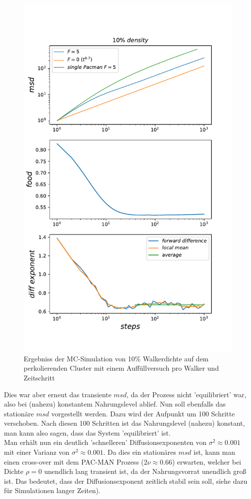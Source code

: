 \documentclass[a4paper, 12pt]{report}
\begin{document}
\begin{figure}[H]
	\centering
	\includegraphics[scale=0.75]{10percent_new_food1.pdf}
	\caption{Ergebniss der MC-Simulation von 10\% Walkerdichte auf dem perkolierenden Cluster mit einem Auffüllversuch pro Walker und Zeitschritt}
\end{figure}

\clearpage

\noindent Dies war aber erneut das transiente $msd$, da der Prozess nicht 'equilibriert' war, also bei (nahezu) konstantem Nahrungslevel ablief. Nun soll ebenfalls das stationäre $msd$ vorgestellt werden. Dazu wird der Aufpunkt um 100 Schritte verschoben. Nach diesen 100 Schritten ist das Nahrungslevel (nahezu) konstant, man kann also sagen, dass das System 'equilibriert' ist.
\\
Man erhält nun ein deutlich 'schnelleren' Diffusionsexponenten von  $\sigma^2 \approx 0.001$ mit einer Varianz von  $\sigma^2 \approx 0.001$. Da dies ein stationäres $msd$ ist, kann man einen cross-over mit dem PAC-MAN Prozess ($2\nu \approx 0.66$) erwarten, welcher bei Dichte $\rho=0$ unendlich lang transient ist, da der Nahrungsvorrat unendlich groß ist. Das bedeutet, dass der Diffusionsexponent zeitlich stabil sein soll, siehe dazu \cite{doi:10.1063/1.4999485} für Simulationen langer Zeiten).
\end{document}
